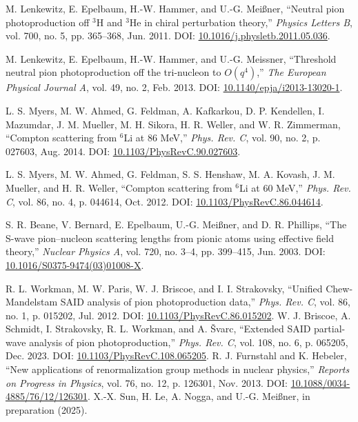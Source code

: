 \documentclass[a4paper,11pt]{article}
\begin{document}
\begin{thebibliography}{99}
  M. Lenkewitz, E. Epelbaum, H.-W. Hammer, and U.-G. Meißner,
  ``Neutral pion photoproduction off $^3$H and $^3$He in chiral
  perturbation theory,'' \textit{Physics Letters B}, vol. 700, no. 5,
  pp. 365–368, Jun. 2011. DOI:
  \href{http://dx.doi.org/10.1016/j.physletb.2011.05.036}{10.1016/j.physletb.2011.05.036}.

  M. Lenkewitz, E. Epelbaum, H.-W. Hammer, and U.-G. Meissner,
  ``Threshold neutral pion photoproduction off the tri-nucleon to
  $O(q^4)$,'' \textit{The European Physical Journal A}, vol. 49, no.
  2, Feb. 2013. DOI:
  \href{http://dx.doi.org/10.1140/epja/i2013-13020-1}{10.1140/epja/i2013-13020-1}.

  L. S. Myers, M. W. Ahmed, G. Feldman, A. Kafkarkou, D. P.
  Kendellen, I. Mazumdar, J. M. Mueller, M. H. Sikora, H. R. Weller,
  and W. R. Zimmerman, ``Compton scattering from $^{6}\mathrm{Li}$ at
  86 MeV,'' \textit{Phys. Rev. C}, vol. 90, no. 2, p. 027603, Aug.
  2014. DOI:
  \href{https://link.aps.org/doi/10.1103/PhysRevC.90.027603}{10.1103/PhysRevC.90.027603}.

  L. S. Myers, M. W. Ahmed, G. Feldman, S. S. Henshaw, M. A. Kovash,
  J. M. Mueller, and H. R. Weller, ``Compton scattering from $^{6}$Li
  at 60 MeV,'' \textit{Phys. Rev. C}, vol. 86, no. 4, p. 044614, Oct.
  2012. DOI:
  \href{https://link.aps.org/doi/10.1103/PhysRevC.86.044614}{10.1103/PhysRevC.86.044614}.

  S. R. Beane, V. Bernard, E. Epelbaum, U.-G. Meißner, and D. R.
  Phillips, ``The S-wave pion–nucleon scattering lengths from pionic
  atoms using effective field theory,'' \textit{Nuclear Physics A},
  vol. 720, no. 3–4, pp. 399–415, Jun. 2003. DOI:
  \href{http://dx.doi.org/10.1016/S0375-9474(03)01008-X}{10.1016/S0375-9474(03)01008-X}.

  R. L. Workman, M. W. Paris, W. J. Briscoe, and I. I. Strakovsky,
  ``Unified Chew-Mandelstam SAID analysis of pion photoproduction
  data,'' \textit{Phys. Rev. C}, vol. 86, no. 1, p. 015202, Jul.
  2012. DOI:
  \href{https://link.aps.org/doi/10.1103/PhysRevC.86.015202}{10.1103/PhysRevC.86.015202}.
  W. J. Briscoe, A. Schmidt, I. Strakovsky, R. L. Workman, and A.
  \ifmmode {}\else \v{S}\fi{}varc, ``Extended SAID
  partial-wave analysis of pion photoproduction,'' \textit{Phys. Rev.
  C}, vol. 108, no. 6, p. 065205, Dec. 2023. DOI:
  \href{https://link.aps.org/doi/10.1103/PhysRevC.108.065205}{10.1103/PhysRevC.108.065205}.
  R. J. Furnstahl and K. Hebeler, ``New applications of
  renormalization group methods in nuclear physics,'' \textit{Reports
  on Progress in Physics}, vol. 76, no. 12, p. 126301, Nov. 2013.
  DOI:
  \href{http://dx.doi.org/10.1088/0034-4885/76/12/126301}{10.1088/0034-4885/76/12/126301}.
  X.-X. Sun, H. Le, A. Nogga, and U.-G. Meißner, in preparation (2025).


\end{thebibliography}
\end{document}
